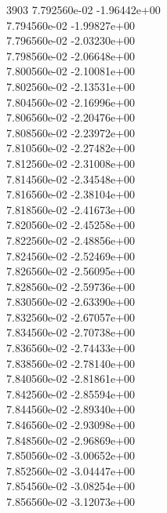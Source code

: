 3903	7.792560e-02	-1.96442e+00	\\ 	7.794560e-02	-1.99827e+00	\\ 	7.796560e-02	-2.03230e+00	\\ 	7.798560e-02	-2.06648e+00	\\ 	7.800560e-02	-2.10081e+00	\\ 	7.802560e-02	-2.13531e+00	\\ 	7.804560e-02	-2.16996e+00	\\ 	7.806560e-02	-2.20476e+00	\\ 	7.808560e-02	-2.23972e+00	\\ 	7.810560e-02	-2.27482e+00	\\ 	7.812560e-02	-2.31008e+00	\\ 	7.814560e-02	-2.34548e+00	\\ 	7.816560e-02	-2.38104e+00	\\ 	7.818560e-02	-2.41673e+00	\\ 	7.820560e-02	-2.45258e+00	\\ 	7.822560e-02	-2.48856e+00	\\ 	7.824560e-02	-2.52469e+00	\\ 	7.826560e-02	-2.56095e+00	\\ 	7.828560e-02	-2.59736e+00	\\ 	7.830560e-02	-2.63390e+00	\\ 	7.832560e-02	-2.67057e+00	\\ 	7.834560e-02	-2.70738e+00	\\ 	7.836560e-02	-2.74433e+00	\\ 	7.838560e-02	-2.78140e+00	\\ 	7.840560e-02	-2.81861e+00	\\ 	7.842560e-02	-2.85594e+00	\\ 	7.844560e-02	-2.89340e+00	\\ 	7.846560e-02	-2.93098e+00	\\ 	7.848560e-02	-2.96869e+00	\\ 	7.850560e-02	-3.00652e+00	\\ 	7.852560e-02	-3.04447e+00	\\ 	7.854560e-02	-3.08254e+00	\\ 	7.856560e-02	-3.12073e+00	\\ \hline
